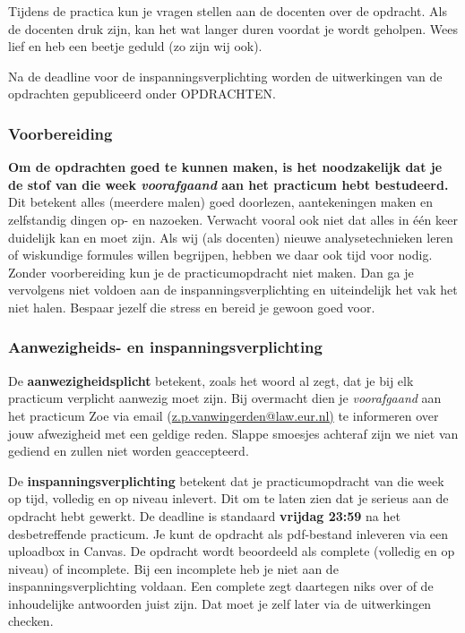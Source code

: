 \documentclass[
  letterpaper,
  DIV=11,
  numbers=noendperiod]{scrreprt}
\begin{document}
Tijdens de practica kun je vragen stellen aan de docenten over de
opdracht. Als de docenten druk zijn, kan het wat langer duren voordat je
wordt geholpen. Wees lief en heb een beetje geduld (zo zijn wij ook).

Na de deadline voor de inspanningsverplichting worden de uitwerkingen
van de opdrachten gepubliceerd onder OPDRACHTEN.

\subsubsection{Voorbereiding}\label{voorbereiding-1}

\textbf{Om de opdrachten goed te kunnen maken, is het noodzakelijk dat
je de stof van die week \emph{voorafgaand} aan het practicum hebt
bestudeerd.} Dit betekent alles (meerdere malen) goed doorlezen,
aantekeningen maken en zelfstandig dingen op- en nazoeken. Verwacht
vooral ook niet dat alles in één keer duidelijk kan en moet zijn. Als
wij (als docenten) nieuwe analysetechnieken leren of wiskundige formules
willen begrijpen, hebben we daar ook tijd voor nodig. Zonder
voorbereiding kun je de practicumopdracht niet maken. Dan ga je
vervolgens niet voldoen aan de inspanningsverplichting en uiteindelijk
het vak het niet halen. Bespaar jezelf die stress en bereid je gewoon
goed voor.

\subsubsection{Aanwezigheids- en
inspanningsverplichting}\label{aanwezigheids--en-inspanningsverplichting}

De \textbf{aanwezigheidsplicht} betekent, zoals het woord al zegt, dat
je bij elk practicum verplicht aanwezig moet zijn. Bij overmacht dien je
\emph{voorafgaand} aan het practicum Zoe via email
(\ul{z.p.vanwingerden@law.eur.nl)} te informeren over jouw afwezigheid
met een geldige reden. Slappe smoesjes achteraf zijn we niet van gediend
en zullen niet worden geaccepteerd.

De \textbf{inspanningsverplichting} betekent dat je practicumopdracht
van die week op tijd, volledig en op niveau inlevert. Dit om te laten
zien dat je serieus aan de opdracht hebt gewerkt. De deadline is
standaard \textbf{vrijdag 23:59} na het desbetreffende practicum. Je
kunt de opdracht als pdf-bestand inleveren via een uploadbox in Canvas.
De opdracht wordt beoordeeld als complete (volledig en op niveau) of
incomplete. Bij een incomplete heb je niet aan de
inspanningsverplichting voldaan. Een complete zegt daartegen niks over
of de inhoudelijke antwoorden juist zijn. Dat moet je zelf later via de
uitwerkingen checken.
\end{document}
